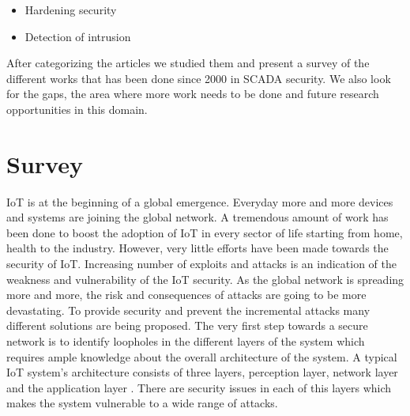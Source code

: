 \documentclass[letterpaper, 10 pt, conference]{ieeeconf}  %
\begin{document}
\begin{itemize}
\renewcommand\labelitemi{--}
\item Hardening security
\item Detection of intrusion
\end{itemize}

After categorizing the articles we studied them and present a survey of the different works that has been done since 2000 in SCADA security. We also look for the gaps, the area where more work needs to be done and future research opportunities in this domain.




\section{Survey}
IoT is at the beginning of a global emergence. Everyday more and more devices and systems are joining the global network. A tremendous amount of work has been done to boost the adoption of IoT in every sector of life starting from home, health to the industry. However, very little efforts have been made towards the security of IoT. Increasing number of exploits and attacks is an indication of the weakness and vulnerability of the IoT security. As the global network is spreading more and more, the risk and consequences of attacks are going to be more devastating. To provide security and prevent the incremental attacks many different solutions are being proposed. The very first step towards a secure network is to identify loopholes in the different layers of the system which requires ample knowledge about the overall architecture of the system. A typical IoT system's architecture consists of three layers, perception layer, network layer and the application layer \cite{c4}\cite{c5}. There are security issues in each of this layers which makes the system vulnerable to a wide range of attacks.
\end{document}
